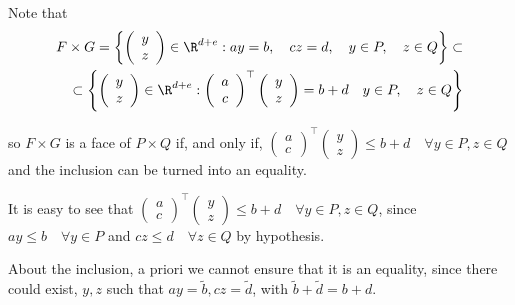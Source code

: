 \begin{enumerate}
Note that \[
\begin{split}
F\times G=\left\{\left(\begin{array}{c}
                 y \\ z
                \end{array}
\right)\in\R^{d+e}:ay=b, \quad cz=d, \quad y\in P, \quad z\in Q\right\} \subset \\
\subset \left\{\left(\begin{array}{c}
                 y \\ z
                \end{array}\right)
\in\R^{d+e}:\left(\begin{array}{c}
                    a \\ c
                   \end{array}\right)^\top
                   \left(\begin{array}{c}
		      y \\ z
		  \end{array}\right)
=b+d \quad y\in P, \quad z\in Q\right\}
\end{split}\]

so $F\times G$ is a face of $P\times Q$ if, and only if, $\left(\begin{array}{c}
                    a \\ c
                   \end{array}\right)^\top
                   \left(\begin{array}{c}
		      y \\ z
		  \end{array}\right)
\leq b+d \quad \forall y\in P, z\in Q$ and the inclusion can be turned into an equality.

It is easy to see that $\left(\begin{array}{c}
                    a \\ c
                   \end{array}\right)^\top
                   \left(\begin{array}{c}
		      y \\ z
		  \end{array}\right)
\leq b+d \quad \forall y\in P, z\in Q$, since $ay\leq b \quad \forall y\in P$ and $cz\leq d \quad \forall z\in Q$ by hypothesis.

About the inclusion, a priori we cannot ensure that it is an equality, since there could exist, $y,z$ such that $ay=\tilde b, cz=\tilde d$, with $\tilde b + \tilde d = b+d$.


\end{enumerate}

